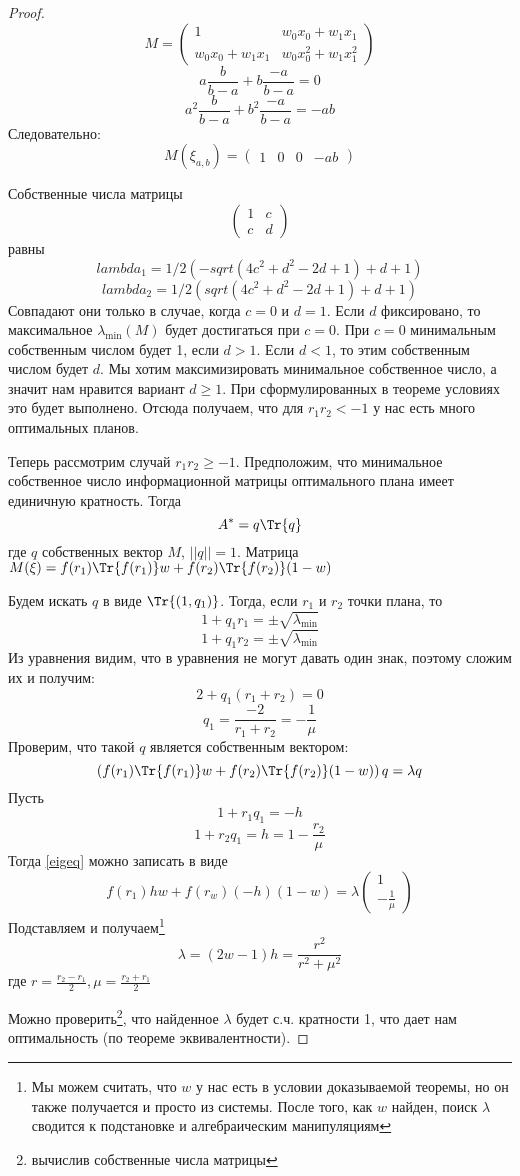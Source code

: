 \begin{proof}
$$ M = \begin{pmatrix} 1 & w_0 x_0 + w_1 x_1 \\ w_0 x_0 + w_1 x_1 & w_0 x_0^2 + w_1 x_1^2 \end{pmatrix}$$
$$ a \frac{b}{b-a} + b \frac{-a}{b-a} = 0$$
$$ a^2 \frac{b}{b-a} + b^2 \frac{-a}{b-a} = -ab$$
Следовательно: 
$$M(\xi_{a,b}) = \begin{pmatrix} 1 & 0 & 0 & -ab \end{pmatrix}$$

Собственные числа матрицы
$$\begin{pmatrix} 1 & c \\ c & d \end{pmatrix}$$ 
равны
$$lambda_1 = 1/2 (-sqrt(4 c^2+d^2-2 d+1)+d+1)$$
$$ lambda_2 = 1/2 (sqrt(4 c^2+d^2-2 d+1)+d+1)$$
Совпадают они только в случае, когда $c=0$ и $d=1$. 
Если $d$ фиксировано, то максимальное $\lambda_{\min}(M)$ будет достигаться при $c = 0$. При $c=0$ минимальным собственным числом будет 1, если $d>1$. Если $d< 1$, то этим собственным числом будет $d$. Мы хотим максимизировать минимальное собственное число, а значит нам нравится вариант $d\geq 1$. При сформулированных в теореме условиях это будет выполнено. Отсюда получаем, что для $r_1r_2 < -1$ у нас есть много оптимальных планов.

Теперь рассмотрим случай $r_1r_2 \geq -1$. Предположим, что минимальное собственное число информационной матрицы оптимального плана имеет единичную кратность. Тогда
$$A^{*} = q\Tr{q}$$
где  $q$ собственных вектор $M$, $||q|| = 1$.
Матрица $M(\xi) = f(r_1)\Tr{f(r_1)}w + f(r_2)\Tr{f(r_2)}(1-w)$ 

Будем искать $q$ в виде $\Tr{(1, q_1)}$. Тогда, если $r_1$ и $r_2$ точки плана, то
$$ 1 + q_1r_1 = ±\sqrt{\lambda_{\min}}$$
$$ 1 + q_1r_2 = ±\sqrt{\lambda_{\min}}$$
Из уравнения видим, что в уравнения не могут давать один знак, поэтому сложим их и получим:
$$2 + q_1(r_1+r_2)=0$$
$$q_1 = \frac{-2}{r_1+r_2} = -\frac{1}{\mu}$$
Проверим, что такой $q$ является собственным вектором:
\begin{equation}
\label{eigeq}
\left(f(r_1)\Tr{f(r_1)}w + f(r_2)\Tr{f(r_2)}(1-w)\right)q = \lambda q
\end{equation}
Пусть 
$$ 1 + r_1 q_1 = -h$$
$$ 1 + r_2 q_1 = h = 1 - \frac{r_2}{\mu}$$ 
Тогда \eqref{eigeq} можно записать в виде
$$ f(r_1) h w + f(r_w)(-h)(1-w) = \lambda \begin{pmatrix} 1 \\ -\frac{1}{\mu} \end{pmatrix}$$
Подставляем и получаем\footnote{Мы можем считать, что $w$ у нас есть в условии доказываемой теоремы, но он также получается и просто из системы. После того, как $w$ найден, поиск $\lambda$ сводится к подстановке и алгебраическим манипуляциям}
$$ \lambda = (2w - 1)h = \frac{r^2}{r^2 + \mu ^2}$$ 
где $r = \frac{r_2 - r_1}{2}, \mu = \frac{r_2+r_1}{2}$

Можно проверить\footnote{вычислив собственные числа матрицы}, что найденное $\lambda$ будет с.ч. кратности 1, что дает нам оптимальность (по теореме эквивалентности).
 \end{proof}

